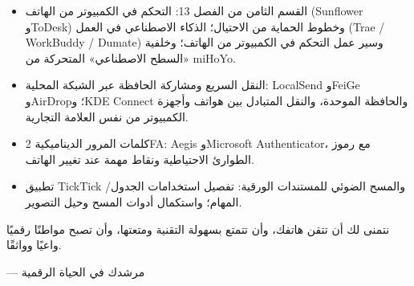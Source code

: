 
\begin{itemize}
  \item القسم الثامن من الفصل 13: التحكم في الكمبيوتر من الهاتف (Sunflower وToDesk) وخطوط الحماية من الاحتيال؛ الذكاء الاصطناعي في العمل (Trae / WorkBuddy / Dumate) وسير عمل التحكم في الكمبيوتر من الهاتف؛ وخلفية «السطح الاصطناعي» المتحركة من miHoYo.
  \item النقل السريع ومشاركة الحافظة عبر الشبكة المحلية: LocalSend وFeiGe وAirDrop؛ وKDE Connect والحافظة الموحدة، والنقل المتبادل بين هواتف وأجهزة الكمبيوتر من نفس العلامة التجارية.
  \item كلمات المرور الديناميكية 2FA: Aegis وMicrosoft Authenticator، مع رموز الطوارئ الاحتياطية ونقاط مهمة عند تغيير الهاتف.
  \item تطبيق TickTick والمسح الضوئي للمستندات الورقية: تفصيل استخدامات الجدول/المهام؛ واستكمال أدوات المسح وحيل التصوير.
\end{itemize}

نتمنى لك أن تتقن هاتفك، وأن تتمتع بسهولة التقنية ومتعتها، وأن تصبح مواطنًا رقميًا واعيًا وواثقًا.

— مرشدك في الحياة الرقمية
